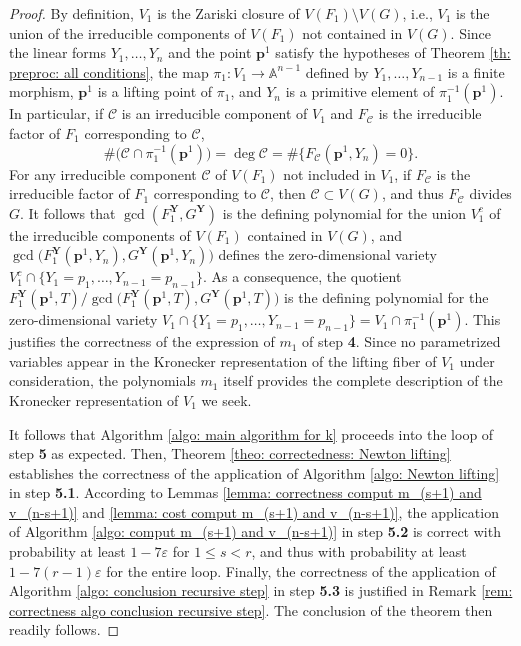 \documentclass[pdflatex,sn-basic]{sn-jnl}%
\theoremstyle{thmstyleone}%
\theoremstyle{thmstyletwo}%
\theoremstyle{thmstylethree}%
\theoremstyle{definition}
\numberwithin{equation}{section}
\newcommand{\bfs}{\boldsymbol}
\newcommand{\A}{\mathbb A}
\begin{document}
\begin{proof}
By definition, $V_1$ is the Zariski closure of $V(F_1)\setminus
V(G)$, i.e., $V_1$ is the union of the irreducible components of
$V(F_1)$ not contained in $V(G)$. Since the linear forms
$Y_1,\ldots,Y_n$ and the point $\bfs p^1$ satisfy the hypotheses of
Theorem \ref{th: preproc: all conditions}, the map
$\pi_1:V_1\to\A^{n-1}$ defined by $Y_1,\ldots,Y_{n-1}$ is a finite
morphism, $\bfs p^1$ is a lifting point of $\pi_1$, and $Y_n$ is a
primitive element of $\pi_1^{-1}(\bfs p^1)$. In particular, if
$\mathcal{C}$ is an irreducible component of $V_1$ and
$F_\mathcal{C}$ is the irreducible factor of $F_1$ corresponding to
$\mathcal{C}$,
$$\#\big(\mathcal{C}\cap\pi_1^{-1}(\bfs p^1)\big)
=\deg\mathcal{C}=\#\{F_\mathcal{C}(\bfs p^1,Y_n)=0\}.$$
%
For any irreducible component $\mathcal{C}$ of
$V(F_1)$ not included in $V_1$, if $F_\mathcal{C}$ is the
irreducible factor of $F_1$ corresponding to $\mathcal{C}$, then
$\mathcal{C}\subset V(G)$, and thus $F_\mathcal{C}$
divides $G$. It follows that $ \gcd(F_1^{\bfs Y},G^{\bfs Y})$ is the
defining polynomial for the union $V_1^c$ of the irreducible
components of $V(F_1)$ contained in $V(G)$, and $ \gcd\big(F_1^{\bfs
Y}(\bfs p^1,Y_n),G^{\bfs Y}(\bfs p^1,Y_n)\big)$ defines
the zero-dimensional variety $V_1^c\cap
\{Y_1=p_1,\ldots,Y_{n-1}=p_{n-1}\}$. As a consequence, the
quotient $F_1^{\bfs
Y}(\bfs p^1,T)/ \gcd\big(F_1^{\bfs Y}(\bfs p^1,T),G^{\bfs Y}(\bfs
p^1,T)\big)$ is the defining polynomial for the zero-dimensional
variety $V_1\cap
\{Y_1=p_1,\ldots,Y_{n-1}=p_{n-1}\}=V_1\cap\pi_1^{-1} (\bfs p^1)$.
This justifies the correctness of the expression of $m_1$ of step {\bf
4}. Since no parametrized variables appear in
the Kronecker representation of the lifting fiber of $V_1$ under consideration,
the polynomials $m_1$ itself provides the complete description of
the Kronecker representation of $V_1$ we seek.

It follows that Algorithm \ref{algo: main algorithm for k} proceeds
into the loop of step {\bf 5} as expected. Then,
Theorem \ref{theo: correctedness: Newton lifting} establishes the
correctness of the application of Algorithm \ref{algo: Newton lifting}
in step {\bf 5.1}. According to Lemmas
\ref{lemma: correctness comput m_(s+1) and v_(n-s+1)} and
\ref{lemma: cost comput m_(s+1) and v_(n-s+1)}, the application of Algorithm
\ref{algo: comput m_(s+1) and v_(n-s+1)} in step {\bf 5.2}
is correct with probability at least $1-7\varepsilon$ for $1\le s<r$,
and thus with probability at least $1-7(r-1)\varepsilon$ for the
entire loop.
Finally, the correctness of the application of Algorithm \ref{algo:
conclusion recursive step} in step {\bf 5.3} is justified in Remark
\ref{rem: correctness algo conclusion recursive step}. The
conclusion of the theorem then readily follows.
\end{proof}
\end{document}
